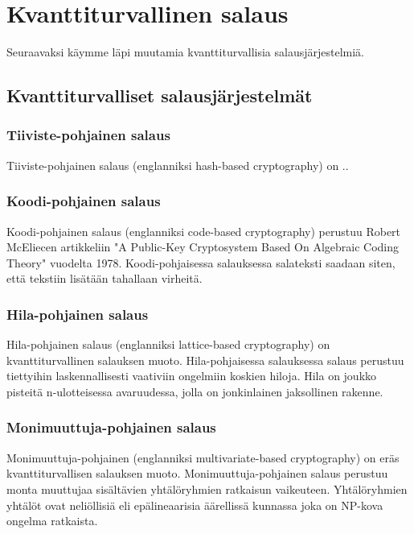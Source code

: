 \chapter{Kvanttiturvallinen salaus\label{results}}
Seuraavaksi käymme läpi muutamia kvanttiturvallisia salausjärjestelmiä.

\section{Kvanttiturvalliset salausjärjestelmät}

\subsection{Tiiviste-pohjainen salaus}
Tiiviste-pohjainen salaus (englanniksi hash-based cryptography) on ..

\subsection{Koodi-pohjainen salaus}
Koodi-pohjainen salaus (englanniksi code-based cryptography) perustuu Robert McEliecen artikkeliin "A Public-Key Cryptosystem Based On Algebraic Coding Theory" vuodelta 1978. Koodi-pohjaisessa salauksessa salateksti saadaan siten, että tekstiin lisätään tahallaan virheitä.

\subsection{Hila-pohjainen salaus}
Hila-pohjainen salaus (englanniksi lattice-based cryptography) on kvanttiturvallinen salauksen muoto. Hila-pohjaisessa salauksessa salaus perustuu tiettyihin laskennallisesti vaativiin ongelmiin koskien hiloja. Hila on joukko pisteitä n-ulotteisessa avaruudessa, jolla on jonkinlainen jaksollinen rakenne.

\subsection{Monimuuttuja-pohjainen salaus}
Monimuuttuja-pohjainen (englanniksi multivariate-based cryptography) on eräs kvanttiturvallisen salauksen muoto. Monimuuttuja-pohjainen salaus perustuu monta muuttujaa sisältävien yhtälöryhmien ratkaisun vaikeuteen. Yhtälöryhmien yhtälöt ovat neliöllisiä eli epälineaarisia äärellissä kunnassa joka on NP-kova ongelma ratkaista. 